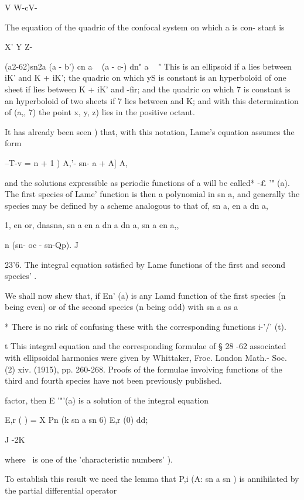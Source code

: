 {{{{{{{V W-cV-

The equation of the quadric of the confocal system on which a is con-
stant is

X' Y Z-

(a2-62)sn2a (a - b') cn a ~ (a - c-) dn" a ~ " This is an ellipsoid if
a lies between iK' and K + iK'; the quadric on which yS is constant
is an hyperboloid of one sheet if lies between K + iK' and -fir; and
the quadric on which 7 is constant is an hyperboloid of two sheets if
7 lies between and K; and with this determination of (a,, 7) the
point x, y, z) lies in the positive octant.

It has already been seen ) that, with this notation, Lame's
equation assumes the form

--T-v = n + 1 ) A,'- sn- a + A] A,

and the solutions expressible as periodic functions of a will be
called* -£ '" (a). The first species of Lame' function is then a
polynomial in sn a, and generally the species may be defined by a
scheme analogous to that of, sn a, en a dn a,

1, en or, dnasna, sn a en a dn a dn a, sn a en a,,

n (sn- oc - sn-Qp). J

23'6. The integral equation satisfied by Lame functions of the first
and second species' .

We shall now shew that, if En' (a) is any Lamd function of the first
species (n being even) or of the second species (n being odd) with sn
a as a

* There is no risk of confusing these with the corresponding functions
i-'/' (t).

t This integral equation and the corresponding formulae of § 28 -62
associated with ellipsoidal harmonics were given by Whittaker, Froc.
London Math.- Soc. (2) xiv. (1915), pp. 260-268. Proofs of the
formulae involving functions of the third and fourth species have not
been previously published.

%
%

factor, then E '"'(a) is a solution of the integral equation

E,r ( ) = X Pn (k sn a sn 6) E,r (0) dd;

J -2K

where \ is one of the 'characteristic numbers' ).

To establish this result we need the lemma that P,i (A: sn a sn ) is
annihilated by the partial differential operator

}}}}}}}
